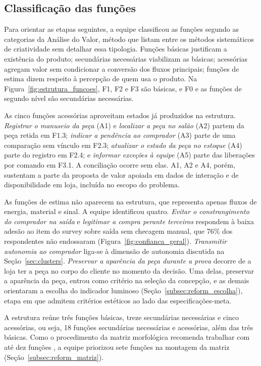 \subsection{Classificação das funções}
\label{sec:classificacao_funcoes}

Para orientar as etapas seguintes, a equipe classificou as funções segundo as categorias da Análise do Valor, método que  listam entre os métodos sistemáticos de criatividade sem detalhar essa tipologia. Funções básicas justificam a existência do produto; secundárias necessárias viabilizam as básicas; acessórias agregam valor sem condicionar a conversão dos fluxos principais; funções de estima dizem respeito à percepção de quem usa o produto. Na Figura~\ref{fig:estrutura_funcoes}, F1, F2 e F3 são básicas, e F0 e as funções de segundo nível são secundárias necessárias.

As cinco funções acessórias aproveitam estados já produzidos na estrutura. \emph{Registrar o manuseio da peça} (A1) e \emph{localizar a peça no salão} (A2) partem da peça retida em F1.3; \emph{indicar a pendência ao comprador} (A3) parte de uma comparação sem vínculo em F2.3; \emph{atualizar o estado da peça no estoque} (A4) parte do registro em F2.4; e \emph{informar exceções à equipe} (A5) parte das liberações por comando em F3.1. A conciliação ocorre sem elas. A1, A2 e A4, porém, sustentam a parte da proposta de valor apoiada em dados de interação e de disponibilidade em loja, incluída no escopo do problema.

As funções de estima não aparecem na estrutura, que representa apenas fluxos de energia, material e sinal. A equipe identificou quatro. \emph{Evitar o constrangimento do comprador na saída} e \emph{legitimar a compra perante terceiros} respondem à baixa adesão ao item do survey sobre saída sem checagem manual, que 76\% dos respondentes não endossaram (Figura~\ref{fig:confianca_geral}). \emph{Transmitir autonomia ao comprador} liga-se à dimensão de autonomia discutida na Seção~\ref{sec:clusters}. \emph{Preservar a aparência da peça durante a prova} decorre de a loja ter a peça no corpo do cliente no momento da decisão. Uma delas, preservar a aparência da peça, entrou como critério na seleção da concepção, e as demais orientaram a escolha do indicador luminoso (Seção~\ref{subsec:reform_escolha}), etapa em que  admitem critérios estéticos ao lado das especificações-meta.

A estrutura reúne três funções básicas, treze secundárias necessárias e cinco acessórias, ou seja, 18 funções secundárias necessárias e acessórias, além das três básicas. Como o procedimento da matriz morfológica recomenda trabalhar com até dez funções \cite{rozenfeld2006gestao}, a equipe priorizou sete funções na montagem da matriz (Seção~\ref{subsec:reform_matriz}).
